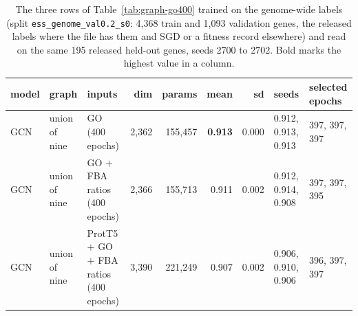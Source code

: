 \begin{table}[H]
  \centering
  \footnotesize
  \caption[Graph convolution on GO trained on the genome-wide labels]{The three rows of Table~\ref{tab:graph-go400} trained on the genome-wide labels (split \texttt{ess\_genome\_val0.2\_s0}: 4,368 train and 1,093 validation genes, the released labels where the file has them and SGD or a fitness record elsewhere) and read on the same 195 released held-out genes, seeds 2700 to 2702. Bold marks the highest value in a column.}
  \label{tab:graph-go400-genome}
  \begin{tabular}{@{}lllrrrrll@{}}
    \hline
    model & graph & inputs & dim & params & mean & sd & seeds & selected epochs \\
    \hline
    GCN & union of nine & GO (400 epochs) & 2,362 & 155,457 & \textbf{0.913} & 0.000 & 0.912, 0.913, 0.913 & 397, 397, 397 \\
    GCN & union of nine & GO $+$ FBA ratios (400 epochs) & 2,366 & 155,713 & 0.911 & 0.002 & 0.912, 0.914, 0.908 & 397, 397, 395 \\
    GCN & union of nine & ProtT5 $+$ GO $+$ FBA ratios (400 epochs) & 3,390 & 221,249 & 0.907 & 0.002 & 0.906, 0.910, 0.906 & 396, 397, 397 \\
    \hline
  \end{tabular}
\end{table}
